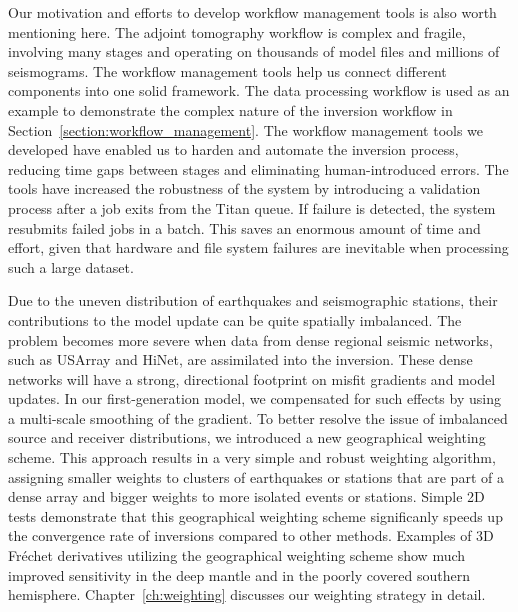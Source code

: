 Our motivation and efforts to develop workflow management tools is also worth mentioning here.
The adjoint tomography workflow is complex and fragile, involving many stages and operating
on thousands of model files and millions of seismograms.
The workflow management tools help us connect different components into one solid
framework.
The data processing workflow is used as an example to demonstrate the complex
nature of the inversion workflow
in Section~\ref{section:workflow_management}.
The workflow management tools we developed have enabled us to harden and automate the inversion process,
reducing time gaps between stages and eliminating human-introduced errors.
The tools have increased the robustness of the system by introducing
a validation process after a job exits from the Titan queue.
If failure is detected, the system resubmits failed jobs in a batch.
This saves an enormous amount of time and effort,
given that hardware and file system failures are inevitable when processing such a large dataset.

Due to the uneven distribution of earthquakes and seismographic stations,
their contributions to the model update can be quite spatially imbalanced.
The problem becomes more severe when data from dense regional seismic networks, such as USArray and HiNet,
are assimilated into the inversion.
These dense networks will have a strong, directional footprint on misfit gradients and
model updates.
In our first-generation model,
we compensated for such effects by using a multi-scale smoothing of the gradient.
To better resolve the issue of imbalanced source and receiver distributions,
we introduced a new geographical weighting scheme.
This approach results in a very simple and robust weighting algorithm,
assigning smaller weights to clusters of earthquakes or stations that are part of a dense array and bigger weights to more isolated events or stations.
Simple 2D tests demonstrate that this geographical weighting scheme significanly speeds up the
convergence rate of inversions compared to other methods.
Examples of 3D Fr\'echet derivatives utilizing the geographical weighting scheme show
much improved sensitivity in the deep mantle and in the poorly covered southern hemisphere.
Chapter~\ref{ch:weighting} discusses our weighting strategy in detail.

